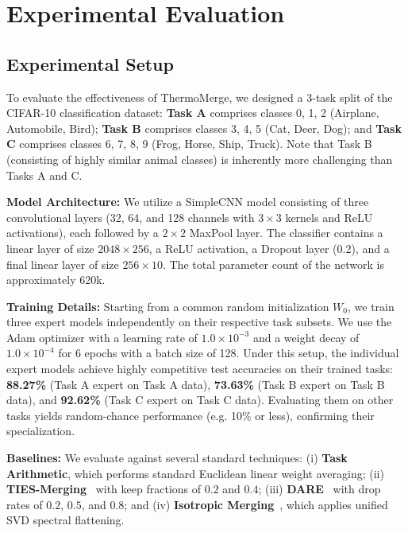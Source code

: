 \documentclass{article}
\theoremstyle{plain}
\theoremstyle{definition}
\theoremstyle{remark}
\begin{document}
\section{Experimental Evaluation}
\label{sec:experiments}

\subsection{Experimental Setup}
To evaluate the effectiveness of ThermoMerge, we designed a 3-task split of the CIFAR-10 classification dataset: \textbf{Task A} comprises classes 0, 1, 2 (Airplane, Automobile, Bird); \textbf{Task B} comprises classes 3, 4, 5 (Cat, Deer, Dog); and \textbf{Task C} comprises classes 6, 7, 8, 9 (Frog, Horse, Ship, Truck). Note that Task B (consisting of highly similar animal classes) is inherently more challenging than Tasks A and C.

\textbf{Model Architecture:} We utilize a SimpleCNN model consisting of three convolutional layers (32, 64, and 128 channels with $3 \times 3$ kernels and ReLU activations), each followed by a $2 \times 2$ MaxPool layer. The classifier contains a linear layer of size $2048 \times 256$, a ReLU activation, a Dropout layer (0.2), and a final linear layer of size $256 \times 10$. The total parameter count of the network is approximately 620k.

\textbf{Training Details:} Starting from a common random initialization $W_0$, we train three expert models independently on their respective task subsets. We use the Adam optimizer with a learning rate of $1.0 \times 10^{-3}$ and a weight decay of $1.0 \times 10^{-4}$ for 6 epochs with a batch size of 128. Under this setup, the individual expert models achieve highly competitive test accuracies on their trained tasks: \textbf{88.27\%} (Task A expert on Task A data), \textbf{73.63\%} (Task B expert on Task B data), and \textbf{92.62\%} (Task C expert on Task C data). Evaluating them on other tasks yields random-chance performance (e.g. 10\% or less), confirming their specialization.

\textbf{Baselines:} We evaluate against several standard techniques: (i) \textbf{Task Arithmetic}, which performs standard Euclidean linear weight averaging; (ii) \textbf{TIES-Merging}~\cite{yadav24} with keep fractions of $0.2$ and $0.4$; (iii) \textbf{DARE}~\cite{yu24} with drop rates of $0.2$, $0.5$, and $0.8$; and (iv) \textbf{Isotropic Merging}~\cite{marczak25a, saim26}, which applies unified SVD spectral flattening.
\end{document}
